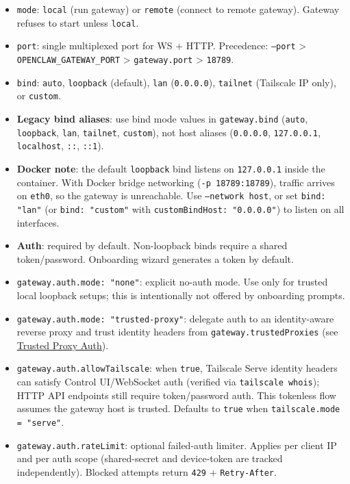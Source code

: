\begin{itemize}
  \item \texttt{mode}: \texttt{local} (run gateway) or \texttt{remote} (connect to remote gateway). Gateway refuses to start unless \texttt{local}.
  \item \texttt{port}: single multiplexed port for WS + HTTP. Precedence: \texttt{--port} > \texttt{OPENCLAW\_GATEWAY\_PORT} > \texttt{gateway.port} > \texttt{18789}.
  \item \texttt{bind}: \texttt{auto}, \texttt{loopback} (default), \texttt{lan} (\texttt{0.0.0.0}), \texttt{tailnet} (Tailscale IP only), or \texttt{custom}.
  \item \textbf{Legacy bind aliases}: use bind mode values in \texttt{gateway.bind} (\texttt{auto}, \texttt{loopback}, \texttt{lan}, \texttt{tailnet}, \texttt{custom}), not host aliases (\texttt{0.0.0.0}, \texttt{127.0.0.1}, \texttt{localhost}, \texttt{::}, \texttt{::1}).
  \item \textbf{Docker note}: the default \texttt{loopback} bind listens on \texttt{127.0.0.1} inside the container. With Docker bridge networking (\texttt{-p 18789:18789}), traffic arrives on \texttt{eth0}, so the gateway is unreachable. Use \texttt{--network host}, or set \texttt{bind: "lan"} (or \texttt{bind: "custom"} with \texttt{customBindHost: "0.0.0.0"}) to listen on all interfaces.
  \item \textbf{Auth}: required by default. Non-loopback binds require a shared token/password. Onboarding wizard generates a token by default.
  \item \texttt{gateway.auth.mode: "none"}: explicit no-auth mode. Use only for trusted local loopback setups; this is intentionally not offered by onboarding prompts.
  \item \texttt{gateway.auth.mode: "trusted-proxy"}: delegate auth to an identity-aware reverse proxy and trust identity headers from \texttt{gateway.trustedProxies} (see \href{/gateway/trusted-proxy-auth}{Trusted Proxy Auth}).
  \item \texttt{gateway.auth.allowTailscale}: when \texttt{true}, Tailscale Serve identity headers can satisfy Control UI/WebSocket auth (verified via \texttt{tailscale whois}); HTTP API endpoints still require token/password auth. This tokenless flow assumes the gateway host is trusted. Defaults to \texttt{true} when \texttt{tailscale.mode = "serve"}.
  \item \texttt{gateway.auth.rateLimit}: optional failed-auth limiter. Applies per client IP and per auth scope (shared-secret and device-token are tracked independently). Blocked attempts return \texttt{429} + \texttt{Retry-After}.

\end{itemize}
